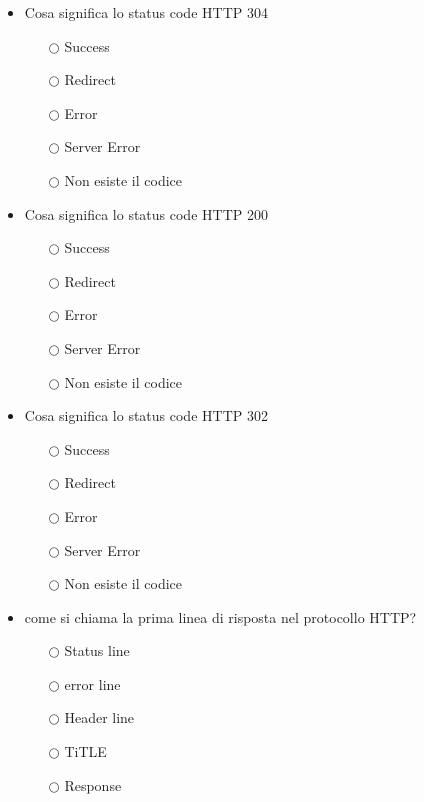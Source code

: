 \documentclass[10pt,twocolumn]{article}
\begin{document}
\begin{itemize}
    \item Cosa significa lo status code HTTP 304
          \begin{itemize}
              \item[$\bigcirc$] Success
              \item[$\bigcirc$] Redirect
              \item[$\bigcirc$] Error
              \item[$\bigcirc$] Server Error
              \item[$\bigcirc$] Non esiste il codice
          \end{itemize}
\end{itemize}
\begin{itemize}
    \item Cosa significa lo status code HTTP 200
          \begin{itemize}
              \item[$\bigcirc$] Success
              \item[$\bigcirc$] Redirect
              \item[$\bigcirc$] Error
              \item[$\bigcirc$] Server Error
              \item[$\bigcirc$] Non esiste il codice
          \end{itemize}
\end{itemize}
\begin{itemize}
    \item Cosa significa lo status code HTTP 302
          \begin{itemize}
              \item[$\bigcirc$] Success
              \item[$\bigcirc$] Redirect
              \item[$\bigcirc$] Error
              \item[$\bigcirc$] Server Error
              \item[$\bigcirc$] Non esiste il codice
          \end{itemize}
\end{itemize}
\begin{itemize}
    \item come si chiama la prima linea di risposta nel protocollo HTTP?
          \begin{itemize}
              \item[$\bigcirc$] Status line
              \item[$\bigcirc$] error line
              \item[$\bigcirc$] Header line
              \item[$\bigcirc$] TiTLE
              \item[$\bigcirc$] Response
          \end{itemize}
\end{itemize}
\end{document}

